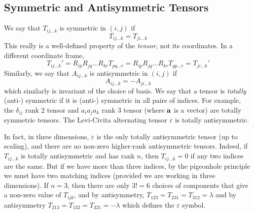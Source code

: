\subsection{Symmetric and Antisymmetric Tensors}
We say that \(T_{ij\dots k}\) is symmetric in \((i, j)\) if
\[
	T_{ij\dots k} = T_{ji\dots k}
\]
This really is a well-defined property of the \textit{tensor}, not its coordinates.
In a different coordinate frame,
\[
	T_{ij\dots k}' = R_{ip}R_{jq}\dots R_{kr} T_{pq\dots r} = R_{ip}R_{jq}\dots R_{kr} T_{qp\dots r} = T_{ji\dots k}'
\]
Similarly, we say that \(A_{ij\dots k}\) is antisymmetric in \((i, j)\) if
\[
	A_{ij\dots k} = -A_{ji\dots k}
\]
which similarly is invariant of the choice of basis.
We say that a tensor is \textit{totally} (anti-) symmetric if it is (anti-) symmetric in all pairs of indices.
For example, the \(\delta_{ij}\) rank 2 tensor and \(a_i a_j a_k\) rank 3 tensor (where \(\vb a\) is a vector) are totally symmetric tensors.
The Levi-Civita alternating tensor \(\varepsilon\) is totally antisymmetric.

In fact, in three dimensions, \(\varepsilon\) is the only totally antisymmetric tensor (up to scaling), and there are no non-zero higher-rank antisymmetric tensors.
Indeed, if \(T_{ij\dots k}\) is totally antisymmetric and has rank \(n\), then \(T_{ij\dots k} = 0\) if any two indices are the same.
But if we have more than three indices, by the pigeonhole principle we must have two matching indices (provided we are working in three dimensions).
If \(n=3\), then there are only \(3!
= 6\) choices of components that give a non-zero value of \(T_{ijk}\), and by antisymmetry, \(T_{123} = T_{231} = T_{312} = \lambda\) and by antisymmetry \(T_{213} = T_{132} = T_{321} = -\lambda\) which defines the \(\varepsilon\) symbol.

